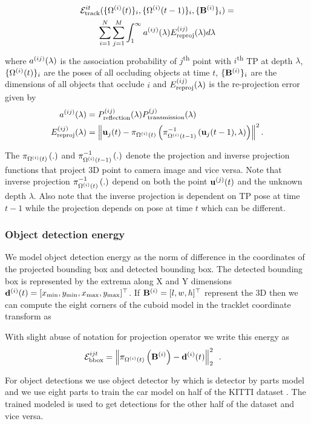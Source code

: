 \begin{multline}
  \mathcal{E}^{it}_{\text{track}}(\{ \Omega^{(i)}(t) \}_i, \{ \Omega^{(i)}(t-1) \}_i, \{\mathbf{B}^{(i)}\}_i ) = 
  \\
    \sum_{i=1}^{N} 
    \sum_{j = 1}^{M}
    \int_1^\infty a^{(ij)}(\lambda)E^{(ij)}_{\text{reproj}}(\lambda) d\lambda
\end{multline}
where $a^{(ij)}(\lambda)$ is the association probability of
$j$\textsuperscript{th} point with $i$\textsuperscript{th} TP at depth $\lambda$, $\{ \Omega^{(i)}(t) \}_i$ are the poses of all occluding objects at time $t$, $ \{ \mathbf{B}^{(i)} \}_i$ are the dimensions of all objects that occlude $i$
and $E^{(ij)}_{\text{reproj}}(\lambda)$ is the re-projection error given by
%
\begin{align}
  a^{(ij)}(\lambda) &= P^{(ij)}_{\text{reflection}}(\lambda)P^{(j)}_{\text{transmission}}(\lambda)\\
  E^{(ij)}_{\text{reproj}}(\lambda) &= \left\|\mathbf{u}_j(t) - \pi_{\Omega^{(i)}(t)}\left(\pi^{-1}_{\Omega^{(i)}(t-1)}\left(\mathbf{u}_j(t-1), \lambda\right)\right)\right\|^2 .
  \label{eq:reprojerror}
\end{align}

The  $\pi_{\Omega^{(i)}(t)}\left(.\right)$ and $\pi^{-1}_{\Omega^{(i)}(t-1)}\left(.\right)$ denote the projection and
inverse projection functions that project 3D point to camera image and vice
versa. Note that inverse projection $\pi^{-1}_{\Omega^{(i)}(t)}\left(.\right)$ depend on both the
point $\mathbf{u}^{(j)}(t)$ and the unknown depth $\lambda$. Also note that the inverse projection is dependent on TP pose at time $t-1$ while the projection depends on pose at time $t$ which can be different.

\subsubsection{Object detection energy}

We model object detection energy as the norm of difference in the coordinates
of the projected bounding box and detected bounding box. The detected bounding
box is represented by the extrema along X and Y dimensions $\mathbf{d}^{(i)}(t) = [x_\text{min},
y_\text{min}, x_\text{max}, y_\text{max}]^\top$. If $\mathbf{B}^{(i)} = [l, w, h]^\top$ represent the 3D
then we can compute the eight corners of the cuboid model in the tracklet
coordinate transform as

With slight abuse of notation for projection operator we write this energy as
\begin{align}
  \mathcal{E}^{ijt}_{\text{bbox}} &= \left\| \pi_{\Omega^{(i)}(t)}\left(\mathbf{B}^{(i)}\right) - \mathbf{d}^{(i)}(t)\right\|^2_2 \enspace.
\end{align}

For object detections we use object detector by \cite{Felzenszwalb_etal_2010}
which is detector by parts model and we use eight parts to train the car model 
on half of the KITTI dataset \cite{geiger2013vision}. The trained modeled is 
used to get detections for the other half of the dataset and vice versa.


